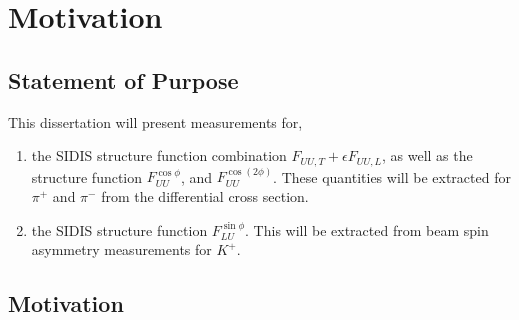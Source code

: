 \section{Motivation}

\subsection{Statement of Purpose}
This dissertation will present measurements for, 

\begin{enumerate}
  \item the SIDIS structure function combination $F_{UU,T} + \epsilon F_{UU,L}$, as well as the structure function $F_{UU}^{\cos\phi}$, and $F_{UU}^{\cos(2\phi)}$.  These quantities will be extracted for $\pi^+$ and $\pi^-$ from the differential cross section.
  \item the SIDIS structure function $F_{LU}^{\sin\phi}$.  This will be extracted from beam spin asymmetry measurements for $K^{+}$.
\end{enumerate}

\subsection{Motivation}



